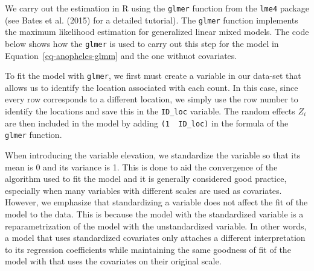 \documentclass[
  letterpaper,
]{krantz}
\newenvironment{Shaded}{\begin{snugshade}}{\end{snugshade}}
\newcommand{\AttributeTok}[1]{\textcolor[rgb]{0.40,0.45,0.13}{#1}}
\newcommand{\CommentTok}[1]{\textcolor[rgb]{0.37,0.37,0.37}{#1}}
\newcommand{\DecValTok}[1]{\textcolor[rgb]{0.68,0.00,0.00}{#1}}
\newcommand{\FunctionTok}[1]{\textcolor[rgb]{0.28,0.35,0.67}{#1}}
\newcommand{\NormalTok}[1]{\textcolor[rgb]{0.00,0.23,0.31}{#1}}
\newcommand{\OtherTok}[1]{\textcolor[rgb]{0.00,0.23,0.31}{#1}}
\newcommand{\SpecialCharTok}[1]{\textcolor[rgb]{0.37,0.37,0.37}{#1}}
\begin{document}
We carry out the estimation in R using the \texttt{glmer} function from
the \texttt{lme4} package (see Bates et al. (2015) for a detailed
tutorial). The \texttt{glmer} function implements the maximum likelihood
estimation for generalized linear mixed models. The code below shows how
the \texttt{glmer} is used to carry out this step for the model in
Equation~\ref{eq-anopheles-glmm} and the one withuot covariates.

\begin{Shaded}
\end{Shaded}

To fit the model with \texttt{glmer}, we first must create a variable in
our data-set that allows us to identify the location associated with
each count. In this case, since every row corresponds to a different
location, we simply use the row number to identify the locations and
save this in the \texttt{ID\_loc} variable. The random effects \(Z_i\)
are then included in the model by adding
\texttt{(1\ \textbar{}\ ID\_loc)} in the formula of the \texttt{glmer}
function.

When introducing the variable elevation, we standardize the variable so
that its mean is 0 and its variance is 1. This is done to aid the
convergence of the algorithm used to fit the model and it is generally
considered good practice, especially when many variables with different
scales are used as covariates. However, we emphasize that standardizing
a variable does not affect the fit of the model to the data. This is
because the model with the standardized variable is a reparametrization
of the model with the unstandardized variable. In other words, a model
that uses standardized covariates only attaches a different
interpretation to its regression coefficients while maintaining the same
goodness of fit of the model with that uses the covariates on their
original scale.
\end{document}
